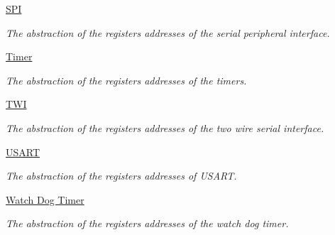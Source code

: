 \begin{DoxyCompactItemize}
\hyperlink{group__SPIMCAL}{S\+P\+I}
\begin{DoxyCompactList}\small\item\em The abstraction of the registers addresses of the serial peripheral interface. \end{DoxyCompactList}\item 
\hyperlink{group__TIMERMCAL}{Timer}
\begin{DoxyCompactList}\small\item\em The abstraction of the registers addresses of the timers. \end{DoxyCompactList}\item 
\hyperlink{group__TWIMCAL}{T\+W\+I}
\begin{DoxyCompactList}\small\item\em The abstraction of the registers addresses of the two wire serial interface. \end{DoxyCompactList}\item 
\hyperlink{group__USARTMCAL}{U\+S\+A\+R\+T}
\begin{DoxyCompactList}\small\item\em The abstraction of the registers addresses of U\+S\+A\+R\+T. \end{DoxyCompactList}\item 
\hyperlink{group__WATCHDOGMCAL}{Watch Dog Timer}
\begin{DoxyCompactList}\small\item\em The abstraction of the registers addresses of the watch dog timer. \end{DoxyCompactList}\end{DoxyCompactItemize}
